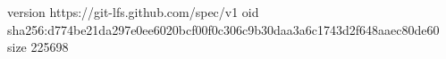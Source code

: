version https://git-lfs.github.com/spec/v1
oid sha256:d774be21da297e0ee6020bcf00f0c306c9b30daa3a6c1743d2f648aaec80de60
size 225698
